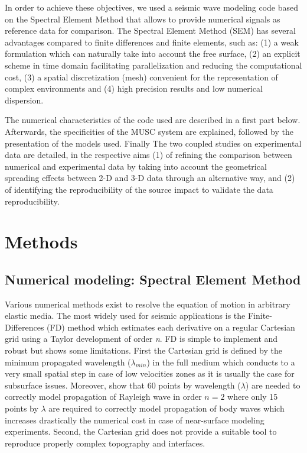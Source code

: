 \documentclass[manuscript,revised]{geophysics}
\newcommand{\twod}{2-D }
\newcommand{\thrd}{3-D }
\begin{document}
\noindent In order to achieve these objectives, we used a seismic wave modeling code based on the Spectral Element Method \citep{Komatitsch_SEM_1998,Komatitsch_ISM_1999,Komatitsch_SEM_2005,Festa_PML_2005} that allows to provide numerical signals as reference data for comparison. The Spectral Element Method (SEM) has several advantages compared to finite differences and finite elements, such as: (1) a weak formulation which can naturally take into account the free surface, (2) an explicit scheme in time domain facilitating parallelization and reducing the computational cost, (3) a spatial discretization (mesh) convenient for the representation of complex environments and (4) high precision results and low numerical dispersion.


\noindent The numerical characteristics of the code used are described in a first part below. Afterwards, the specificities of the MUSC system are explained, followed by the presentation of the models used. Finally The two coupled studies on experimental data are detailed, in the respective aims (1) of refining the comparison between numerical and experimental data by taking into account the geometrical spreading effects between \twod and \thrd data through an alternative way, and (2) of identifying the reproducibility of the source impact to validate the data reproducibility.


\section{Methods}

\subsection{Numerical modeling: Spectral Element Method}

\noindent Various numerical methods exist to resolve the equation of motion in arbitrary elastic media. The most widely used for seismic applications is the Finite-Differences (FD) method \citep{Virieux_PSV_1986,Levander_PSV_1988,Robertsson_FDM_1994,Pratt_EWM_1990,Stekl_VEM_1998,Saenger_FDM_2004} which estimates each derivative on a regular Cartesian grid using a Taylor development \citep{Moczo_FDM_2004} of order \textit{n}. FD is simple to implement and robust but shows some limitations. First the Cartesian grid is defined by the minimum propagated wavelength ($\lambda_{min}$) in the full medium which conducts to a very small spatial step in case of low velocities zones as it is usually the case for subsurface issues. Moreover, \citet{Saenger_FDM_2000} show that 60 points by wavelength ($\lambda$) are needed to correctly model propagation of Rayleigh wave in order $n=2$ where only 15 points by $\lambda$ are required to correctly model propagation of body waves which increases drastically the numerical cost in case of near-surface modeling experiments. Second, the Cartesian grid does not provide a suitable tool to reproduce properly complex topography and interfaces. 
\end{document}
